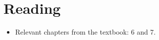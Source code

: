 \documentclass[notes=show]{beamer}
\begin{document}
\section{Reading}

\begin{frame}%


\begin{itemize}
\item Relevant chapters from the textbook: 6 and 7.
\end{itemize}

\end{frame}%
\end{document}
